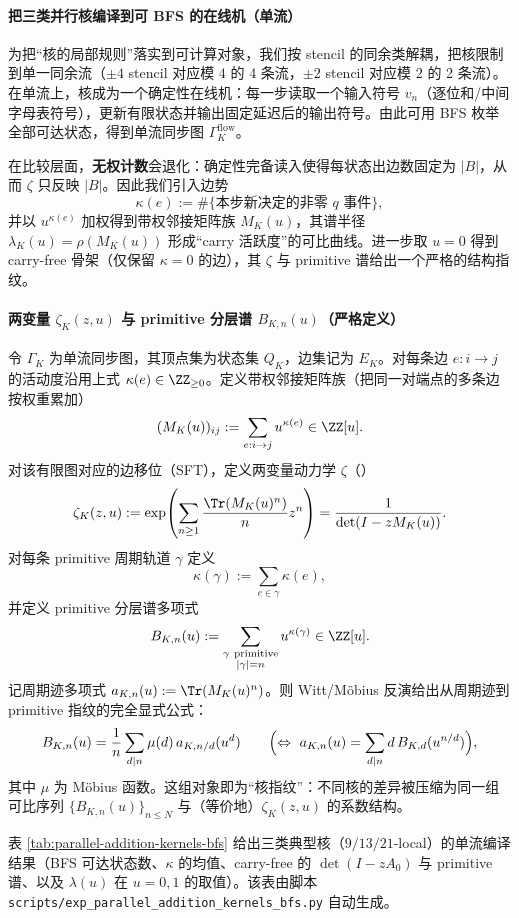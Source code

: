 \paragraph{把三类并行核编译到可 BFS 的在线机（单流）}
为把“核的局部规则”落实到可计算对象，我们按 stencil 的同余类解耦，把核限制到单一同余流（$\pm 4$ stencil 对应模 $4$ 的 4 条流，$\pm 2$ stencil 对应模 $2$ 的 2 条流）。在单流上，核成为一个确定性在线机：每一步读取一个输入符号 $v_n$（逐位和/中间字母表符号），更新有限状态并输出固定延迟后的输出符号。由此可用 BFS 枚举全部可达状态，得到单流同步图 $\Gamma^{\mathrm{flow}}_K$。

在比较层面，\textbf{无权计数}会退化：确定性完备读入使得每状态出边数固定为 $|B|$，从而 $\zeta$ 只反映 $|B|$。因此我们引入边势
\[
\kappa(e):=\#\{\text{本步新决定的非零 }q\text{ 事件}\},
\]
并以 $u^{\kappa(e)}$ 加权得到带权邻接矩阵族 $M_K(u)$，其谱半径 $\lambda_K(u)=\rho(M_K(u))$ 形成“carry 活跃度”的可比曲线。进一步取 $u=0$ 得到 carry-free 骨架（仅保留 $\kappa=0$ 的边），其 $\zeta$ 与 primitive 谱给出一个严格的结构指纹。

\paragraph{两变量 \texorpdfstring{$\zeta_K(z,u)$}{zeta(z,u)} 与 primitive 分层谱 \texorpdfstring{$B_{K,n}(u)$}{B\_{K,n}(u)}（严格定义）}
令 $\Gamma_K$ 为单流同步图，其顶点集为状态集 $Q_K$，边集记为 $E_K$。对每条边 $e:i\to j$ 的活动度沿用上式 $\kappa(e)\in\ZZ_{\ge 0}$。定义带权邻接矩阵族（把同一对端点的多条边按权重累加）
\[
(M_K(u))_{ij}:=\sum_{e:i\to j}u^{\kappa(e)}\in\ZZ[u].
\]
对该有限图对应的边移位（SFT），定义两变量动力学 $\zeta$（\cite{BrinStuck2002,ParryPollicott1990Zeta}）
\[
\zeta_K(z,u)
:=\exp\!\left(\sum_{n\ge 1}\frac{\Tr(M_K(u)^n)}{n}z^n\right)
=\frac{1}{\det(I-zM_K(u))}.
\]
对每条 primitive 周期轨道 $\gamma$ 定义
\[
\kappa(\gamma):=\sum_{e\in\gamma}\kappa(e),
\]
并定义 primitive 分层谱多项式
\[
B_{K,n}(u):=\sum_{\substack{\gamma\ \mathrm{primitive}\\ |\gamma|=n}}u^{\kappa(\gamma)}\in\ZZ[u].
\]
记周期迹多项式 $a_{K,n}(u):=\Tr(M_K(u)^n)$。则 Witt/Möbius 反演给出从周期迹到 primitive 指纹的完全显式公式：
\[
B_{K,n}(u)=\frac{1}{n}\sum_{d\mid n}\mu(d)\,a_{K,n/d}(u^d)
\qquad\Bigl(\Leftrightarrow\ a_{K,n}(u)=\sum_{d\mid n} d\,B_{K,d}(u^{n/d})\Bigr),
\]
其中 $\mu$ 为 Möbius 函数。这组对象即为“核指纹”：不同核的差异被压缩为同一组可比序列 $\{B_{K,n}(u)\}_{n\le N}$ 与（等价地）$\zeta_K(z,u)$ 的系数结构。

表 \ref{tab:parallel-addition-kernels-bfs} 给出三类典型核（$9/13/21$-local）的单流编译结果（BFS 可达状态数、$\kappa$ 的均值、carry-free 的 $\det(I-zA_0)$ 与 primitive 谱、以及 $\lambda(u)$ 在 $u=0,1$ 的取值）。该表由脚本 \texttt{scripts/exp\_parallel\_addition\_kernels\_bfs.py} 自动生成。


